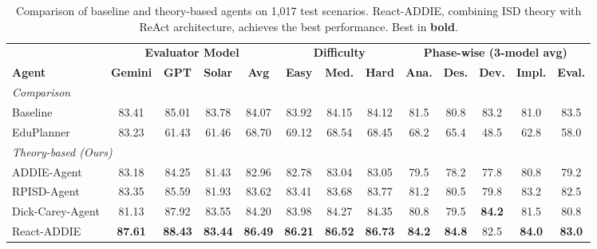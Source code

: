 \begin{table}[!t]
\centering
\small
\caption{Comparison of baseline and theory-based agents on 1,017 test scenarios. React-ADDIE, combining ISD theory with ReAct architecture, achieves the best performance. Best in \textbf{bold}.}
\label{tab:main-results}
\begin{tabular}{l cccc ccc ccccc}
\toprule
& \multicolumn{4}{c}{\textbf{Evaluator Model}} & \multicolumn{3}{c}{\textbf{Difficulty}} & \multicolumn{5}{c}{\textbf{Phase-wise (3-model avg)}} \\
\cmidrule(lr){2-5} \cmidrule(lr){6-8} \cmidrule(lr){9-13}
\textbf{Agent} & \textbf{Gemini} & \textbf{GPT} & \textbf{Solar} & \textbf{Avg} & \textbf{Easy} & \textbf{Med.} & \textbf{Hard} & \textbf{Ana.} & \textbf{Des.} & \textbf{Dev.} & \textbf{Impl.} & \textbf{Eval.} \\
\midrule
\multicolumn{13}{l}{\textit{Comparison}} \\
\quad Baseline & 83.41 & 85.01 & 83.78 & 84.07 & 83.92 & 84.15 & 84.12 & 81.5 & 80.8 & 83.2 & 81.0 & 83.5 \\
\quad EduPlanner~\cite{zhang2025eduplanner} & 83.23 & 61.43 & 61.46 & 68.70 & 69.12 & 68.54 & 68.45 & 68.2 & 65.4 & 48.5 & 62.8 & 58.0 \\
\midrule
\multicolumn{13}{l}{\textit{Theory-based (Ours)}} \\
\quad ADDIE-Agent & 83.18 & 84.25 & 81.43 & 82.96 & 82.78 & 83.04 & 83.05 & 79.5 & 78.2 & 77.8 & 80.8 & 79.2 \\
\quad RPISD-Agent & 83.35 & 85.59 & 81.93 & 83.62 & 83.41 & 83.68 & 83.77 & 81.2 & 80.5 & 79.8 & 83.2 & 82.5 \\
\quad Dick-Carey-Agent & 81.13 & 87.92 & 83.55 & 84.20 & 83.98 & 84.27 & 84.35 & 80.8 & 79.5 & \textbf{84.2} & 81.5 & 80.8 \\
\quad React-ADDIE & \textbf{87.61} & \textbf{88.43} & \textbf{83.44} & \textbf{86.49} & \textbf{86.21} & \textbf{86.52} & \textbf{86.73} & \textbf{84.2} & \textbf{84.8} & 82.5 & \textbf{84.0} & \textbf{83.0} \\
\bottomrule
\end{tabular}
\end{table}
